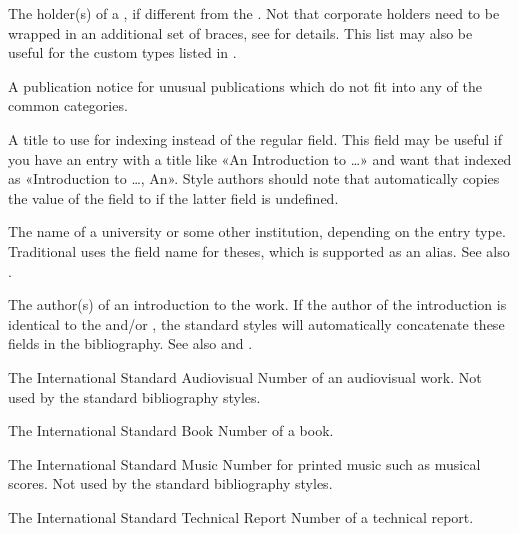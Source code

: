 \documentclass{ltxdockit}[2011/03/25]
\begin{document}
\begin{fieldlist}
The holder(s) of a , if different from the . Not that corporate holders need to be wrapped in an additional set of braces, see  for details. This list may also be useful for the custom types listed in .


A publication notice for unusual publications which do not fit into any of the common categories.


A title to use for indexing instead of the regular  field. This field may be useful if you have an entry with a title like «An Introduction to \dots» and want that indexed as «Introduction to \dots, An». Style authors should note that  automatically copies the value of the  field to  if the latter field is undefined.


The name of a university or some other institution, depending on the entry type. Traditional \bibtex uses the field name  for theses, which is supported as an alias. See also .


The author(s) of an introduction to the work. If the author of the introduction is identical to the  and\slash or , the standard styles will automatically concatenate these fields in the bibliography. See also  and .


The International Standard Audiovisual Number of an audiovisual work. Not used by the standard bibliography styles.


The International Standard Book Number of a book.


The International Standard Music Number for printed music such as musical scores. Not used by the standard bibliography styles.


The International Standard Technical Report Number of a technical report.



\end{fieldlist}
\end{document}
